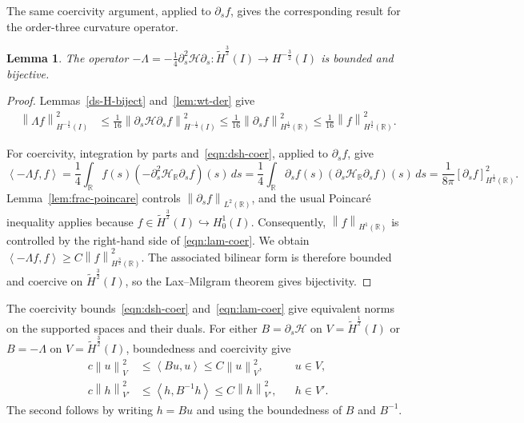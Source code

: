 \documentclass[11pt,reqno]{amsart}
\theoremstyle{plain}
\newtheorem{lemma}[theorem]{Lemma}
\theoremstyle{definition}
\numberwithin{equation}{section}
\newcommand{\p}{\partial}
\newcommand{\mc}[1]{\mathcal{#1}}
\newcommand{\wt}[1]{\widetilde{#1}}
\newcommand{\norm}[1]{\left\lVert #1 \right\rVert}
\newcommand{\dual}[2]{\left\langle #1,#2 \right\rangle}
\newcommand{\R}{\mathbb{R}}
\newcommand{\hi}[1]{H^{#1}(I)}
\newcommand{\thi}[1]{\wt H^{#1}(I)}
\newcommand{\hr}[1]{H^{#1}(\R)}
\begin{document}
The same coercivity argument, applied to $\p_s f$, gives the corresponding
result for the order-three curvature operator.

\begin{lemma}\label{ds-Lam-biject}
The operator
$-\Lambda=-\frac14\p_s^2\mc H\p_s:
\thi{\frac{3}{2}}\to H^{-\frac{3}{2}}(I)$ is bounded and bijective.
\end{lemma}
\begin{proof}
Lemmas~\ref{ds-H-biject} and~\ref{lem:wt-der} give
\begin{equation}
\begin{aligned}
    \norm{\Lambda f}_{H^{-\frac{3}{2}}(I)}^2
    &\le \frac{1}{16}\norm{\p_s \mc H\p_s f}_{\hi{-\frac{1}{2}}}^2
    \le \frac{1}{16}\norm{\p_s f}_{\hr{\frac{1}{2}}}^2
    \le \frac{1}{16}\norm{f}_{\hr{\frac{3}{2}}}^2.
\end{aligned}
\end{equation}

For coercivity, integration by parts and~\eqref{eqn:dsh-coer}, applied to
$\p_s f$, give
\begin{equation}\label{eqn:lam-coer}
    \dual{-\Lambda f}{f} = \frac{1}{4}\int_\R f(s)(-\p_s^2\mc H_{\R}\p_s f)(s)\,ds = \frac{1}{4}\int_\R \p_s
    f(s)(\p_s\mc H_{\R}\p_s f)(s)\,ds = \frac{1}{8\pi}[\p_s f]_{\hr{\frac{1}{2}}}^2.
\end{equation}
Lemma~\ref{lem:frac-poincare} controls $\norm{\p_s f}_{L^2(\R)}$, and the
usual Poincar\'e inequality applies because
$f\in\thi{\frac{3}{2}}\hookrightarrow H_0^1(I)$. Consequently,
$\norm{f}_{H^1(\R)}$ is controlled by the right-hand side of
\eqref{eqn:lam-coer}. We obtain
$\dual{-\Lambda f}{f}\ge C\norm{f}_{\hr{\frac{3}{2}}}^2$.
The associated bilinear form is therefore bounded and coercive on
$\thi{\frac{3}{2}}$, so the Lax--Milgram theorem gives bijectivity.
\end{proof}

The coercivity bounds~\eqref{eqn:dsh-coer} and~\eqref{eqn:lam-coer} give equivalent norms on the supported spaces and
their duals. For either
$B=\p_s\mc H$ on $V=\thi{\frac12}$ or
$B=-\Lambda$ on $V=\thi{\frac32}$, boundedness and coercivity give
\begin{equation}\label{eqn:coercive-norm-equivalences}
\begin{aligned}
    c\norm{u}_V^2
    &\le \dual{Bu}{u}\le C\norm{u}_V^2,
    &&u\in V,\\
    c\norm{h}_{V'}^2
    &\le \dual{h}{B^{-1}h}\le C\norm{h}_{V'}^2,
    &&h\in V'.
\end{aligned}
\end{equation}
The second follows by writing $h=Bu$ and using the boundedness of $B$ and
$B^{-1}$.
\end{document}
